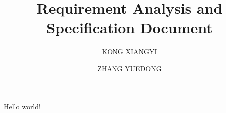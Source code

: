 \documentclass{article}
\title{Requirement Analysis and Specification Document}
\author{
	KONG XIANGYI
	\and
	ZHANG YUEDONG
	}
\begin{document}
 
	
\maketitle

	Hello world! 
\end{document}
